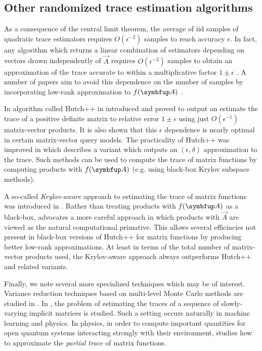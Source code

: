 \subsection{Other randomized trace estimation algorithms}

As a consequence of the central limit theorem, the average of iid samples of quadratic trace estimators requires \( O(\epsilon^{-2}) \) samples to reach accuracy \( \epsilon \). 
In fact, any algorithm which returns a linear combination of estimators depending on vectors drawn independently of \( \vec{A} \) requires \( O(\epsilon^{-2}) \) samples to obtain an approximation of the trace accurate to within a multiplicative factor \( 1\pm \epsilon \) \cite{wimmer_wu_zhang_14}.
A number of papers aim to avoid this dependence on the number of samples by incorporating low-rank approximation to \( \fA \) \cite{lin_17,gambhir_stathopoulos_orginos_17,saibaba_alexanderian_ipsen_17,large_matrices_density_review_18,li_zhu_21,meyer_musco_musco_woodruff_21,persson_cortinovis_kressner_22,chen_hallman_22}.


In \cite{meyer_musco_musco_woodruff_21} algorithm called Hutch++ in introduced and proved to output an estimate the trace of a positive definite matrix to relative error \( 1\pm \epsilon \) using just \( O(\epsilon^{-1}) \) matrix-vector products.
It is also shown that this \( \epsilon \) dependence is nearly optimal in certain matrix-vector query models.
The practicality of Hutch++ was improved in \cite{persson_cortinovis_kressner_22} which describes a variant which outputs an \( (\epsilon,\delta) \) approximation to the trace.
Such methods can be used to compute the trace of matrix functions by computing products with \( \fA \) (e.g. using black-box Krylov subspace methods). 

A so-called \emph{Krylov-aware} approach to estimating the trace of matrix functions was introduced in \cite{chen_hallman_22}.
Rather than treating products with \( \fA \) as a black-box, \cite{chen_hallman_22} advocates a more careful approach in which products with \( \vec{A} \) are viewed as the natural computational primative. 
This allows several efficincies not present in black-box versions of Hutch++ for matrix functions by producing better low-rank approximations. 
At least in terms of the total number of matrix-vector products used, the Krylov-aware approach always outperforms Hutch++ and related variants.

Finally, we note several more specialized techniques which may be of interest.
Variance reduction techniques based on multi-level Monte Carlo methods are studied in \cite{hallman_troester_21,frommer_khalil_ramirezhidalgo_21}.
In \cite{dharangutte_musco_21}, the problem of estimating the traces of a sequence of slowly-varying implicit matrices is studied. 
Such a setting occurs naturally in machine learning and physics. 
In physics, in order to compute important quantities for open quantum systems interacting strongly with their environment, \cite{chen_cheng_22} studies how to approximate the \emph{partial trace} of matrix functions.

